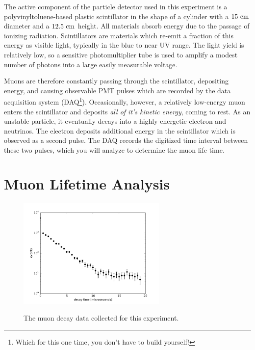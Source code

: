 \documentclass[12pt]{article}
\begin{document}
The active component of the particle detector used in this experiment is a polyvinyltoluene-based plastic scintillator in the shape of a cylinder with a $15~\rm cm$ diameter and a $12.5~\rm cm$ height.  All materials absorb energy due to the passage of ionizing radiation.  Scintillators are materials which re-emit a fraction of this energy as visible light, typically in the blue to near UV range.   The light yield is relatively low, so a sensitive photomultiplier tube is used to amplify a modest number of photons into a large easily measurable voltage. 

Muons are therefore constantly passing through the scintillator, depositing energy, and causing observable PMT pulses which are recorded by the data acquisition system (DAQ\footnote{Which for this one time, you don't have to build yourself!}).  Occasionally, however, a relatively low-energy muon enters the scintillator and deposits {\em all of it's kinetic energy}, coming to rest.  As an unstable particle, it eventually decays into a highly-energetic electron and neutrinos.  The electron deposits additional energy in the scintillator which is observed as a second pulse.  The DAQ records the digitized time interval between these two pulses, which you will analyze to determine the muon life time.

\section{Muon Lifetime Analysis}

\begin{figure}[htbp]
\begin{center}
{\includegraphics[width=0.65\textwidth]{figs/muon.pdf}}\\
\end{center}
\caption{\label{fig:muon}  The muon decay data collected for this experiment.}\end{figure}
\end{document}
